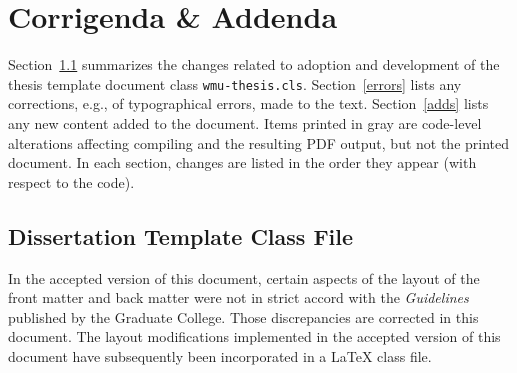 \chapter{Corrigenda \& Addenda}
\label{changes}
\begin{spacing}{1.55}
\newcommand{\code}[1]{{\color{note_gray}#1}}
Section~\ref{toclass} summarizes the changes related to adoption and development of the thesis template document class \texttt{wmu-thesis.cls}. Section~\ref{errors} lists any corrections, e.g., of typographical errors, 
made to the text.
Section~\ref{adds} lists any new content added to the document. 
Items printed in \code{ gray} are code-level alterations affecting compiling and the resulting PDF output, but not the printed document.  In each section, changes are listed in the order they appear (with respect to the code).

\section{Dissertation Template Class File}
\label{toclass}
In the accepted version of this document, certain aspects of the layout of the front matter and back matter were not in strict accord with the \textit{Guidelines} published by the Graduate College.  Those discrepancies are corrected in this document.  The layout modifications implemented in the accepted version of this document have subsequently been incorporated in a \LaTeX{} class file.

\end{spacing}
